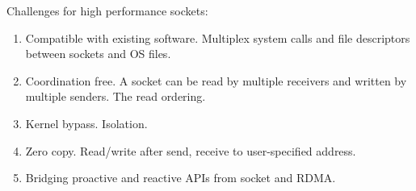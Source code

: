 Challenges for high performance sockets:
\begin{enumerate}
	\item Compatible with existing software. Multiplex system calls and file descriptors between sockets and OS files.
	\item Coordination free. A socket can be read by multiple receivers and written by multiple senders. The read ordering.
	\item Kernel bypass. Isolation.
	\item Zero copy. Read/write after send, receive to user-specified address.
	\item Bridging proactive and reactive APIs from socket and RDMA.
\end{enumerate}
